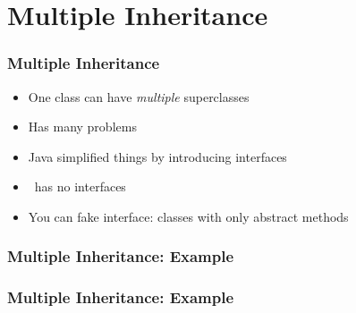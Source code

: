 \section{Multiple Inheritance}

\begin{frame}
  \tableofcontents[currentsection]
\end{frame}

\begin{frame}
  \frametitle{Multiple Inheritance}
  \begin{itemize}
    \item One class can have \emph{multiple} superclasses
    \item Has many problems
    \item Java simplified things by introducing interfaces
    \item \cpp\ has no interfaces
    \item You can fake interface: classes with only abstract methods
  \end{itemize}
\end{frame}

\begin{frame}
  \frametitle{Multiple Inheritance: Example}
\end{frame}

\begin{frame}
  \frametitle{Multiple Inheritance: Example}
\end{frame}

